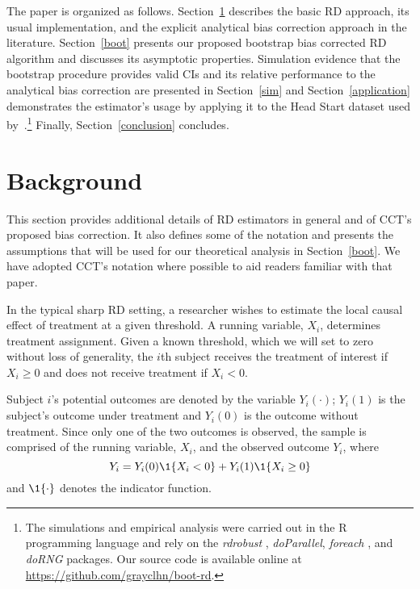 \documentclass[12pt,fleqn]{article}
\begin{document}
The paper is organized as follows. Section~\ref{background} describes the basic
RD approach, its usual implementation, and the explicit analytical bias
correction approach in the literature. Section~\ref{boot} presents our proposed
bootstrap bias corrected RD algorithm and discusses its asymptotic
properties. Simulation evidence that the bootstrap procedure provides valid CIs
and its relative performance to the analytical bias correction are presented in
Section~\ref{sim} and Section~\ref{application} demonstrates the estimator's
usage by applying it to the Head Start dataset used
by~\cite{ludwig2007}.\footnote{%
  The simulations and empirical analysis were carried out in the R programming
  language \citep{R} and rely on the \textit{rdrobust}
  \citep{rdrobust2,rdrobust3},
  \textit{doParallel}, \textit{foreach} \citep{doparallel,foreach}, and
  \textit{doRNG} \citep{dorng} packages. Our source code is available online
  at \url{https://github.com/grayclhn/boot-rd}.} %
Finally, Section~\ref{conclusion} concludes.

\section{Background}\label{background}

This section provides additional details of RD estimators in general and of
CCT's proposed bias correction. It also defines some of the notation and
presents the assumptions that will be used for our theoretical analysis in
Section~\ref{boot}. We have adopted CCT's notation where possible to aid
readers familiar with that paper.

In the typical sharp RD setting, a researcher wishes to estimate the local
causal effect of treatment at a given threshold. A running variable, $X_{i}$,
determines treatment assignment.  Given a known threshold, which we
will set to zero without loss of generality, the $i$th subject receives the
treatment of interest if $X_{i} \geq 0$ and does not receive treatment if
$X_{i} < 0$.

Subject $i$'s potential outcomes are denoted by the variable $Y_i(\cdot)$;
$Y_i(1)$ is the subject's outcome under treatment and $Y_i(0)$
is the outcome without treatment. Since only one of the two
outcomes is observed, the sample is comprised of the running variable, $X_{i}$,
and the observed outcome $Y_i$, where
\begin{equation*}
  Y_{i}=Y_{i}(0) \1\{X_{i}<0\}+Y_{i}(1) \1\{X_{i} \geq 0\}
\end{equation*}
and $\1\{ \cdot\}$ denotes the indicator function.
\end{document}
